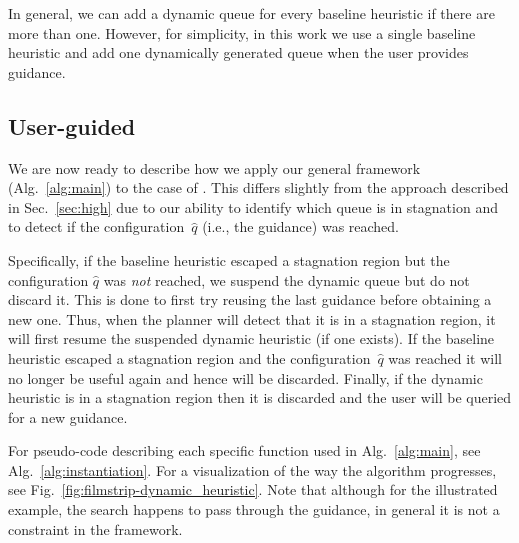 \documentclass{article}
\begin{document}
In general,  we can add a dynamic queue for every baseline heuristic if there are more than one. However, for simplicity, in this work we use a single baseline heuristic and add one dynamically generated queue when the user provides guidance.

\subsection{User-guided \mhastar}
\label{sec:instantiation}
We are now ready to describe how we apply our general framework (Alg.~\ref{alg:main}) to the case of \mhastar.
This differs slightly from the approach described in Sec.~\ref{sec:high} due to our ability to identify which queue is in stagnation and to detect if the configuration~$\hat{q}$ (i.e., the guidance) was reached.

Specifically, if the baseline heuristic escaped a stagnation region but the configuration $\hat{q}$ was \emph{not} reached, we suspend the dynamic queue but do not discard it. 
This is done to first try reusing the last guidance before obtaining a new one. 
Thus, when the planner will detect that it is in a stagnation region, it will first resume the suspended dynamic heuristic (if one exists).
%
If the baseline heuristic escaped a stagnation region and the configuration~$\hat{q}$ was  reached it will no longer be useful again and hence will be discarded.
Finally, if the dynamic heuristic is in a stagnation region then it is discarded and the user will be queried for a new guidance. 

For pseudo-code describing each specific function used  in Alg.~\ref{alg:main}, see Alg.~\ref{alg:instantiation}.
For a visualization of the way the algorithm progresses, see Fig.~\ref{fig:filmstrip-dynamic_heuristic}. Note that although for the illustrated example, the search happens to pass through the guidance, in general it is not a constraint in the framework. 
%
\end{document}
